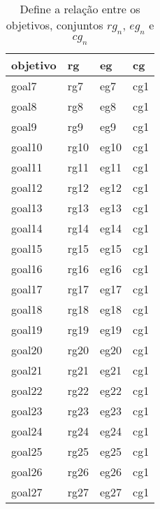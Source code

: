 \begin{table}[H]
\centering
{}
\begin{tabular}{|l|l|l|l|}
\hline
\textbf{objetivo}  & \textbf{rg} & \textbf{eg} & \textbf{cg} \\ \hline
goal7 & rg7 & eg7 & cg1 \\ \hline
goal8 & rg8 & eg8 & cg1 \\ \hline
goal9 & rg9 & eg9 & cg1 \\ \hline
goal10 & rg10 & eg10 & cg1 \\ \hline
goal11 & rg11 & eg11 & cg1 \\ \hline
goal12 & rg12 & eg12 & cg1 \\ \hline
goal13 & rg13 & eg13 & cg1 \\ \hline
goal14 & rg14 & eg14 & cg1 \\ \hline
goal15 & rg15 & eg15 & cg1 \\ \hline
goal16 & rg16 & eg16 & cg1 \\ \hline
goal17 & rg17 & eg17 & cg1 \\ \hline
goal18 & rg18 & eg18 & cg1 \\ \hline
goal19 & rg19 & eg19 & cg1 \\ \hline
goal20 & rg20 & eg20 & cg1 \\ \hline
goal21 & rg21 & eg21 & cg1 \\ \hline
goal22 & rg22 & eg22 & cg1 \\ \hline
goal23 & rg23 & eg23 & cg1 \\ \hline
goal24 & rg24 & eg24 & cg1 \\ \hline
goal25 & rg25 & eg25 & cg1 \\ \hline
goal26 & rg26 & eg26 & cg1 \\ \hline
goal27 & rg27 & eg27 & cg1 \\ \hline
\end{tabular}
\caption{Define a relação entre os objetivos, conjuntos $rg_n$, $eg_n$ e $cg_n$ }
\label{goalsrelationsentity2}
\end{table}
